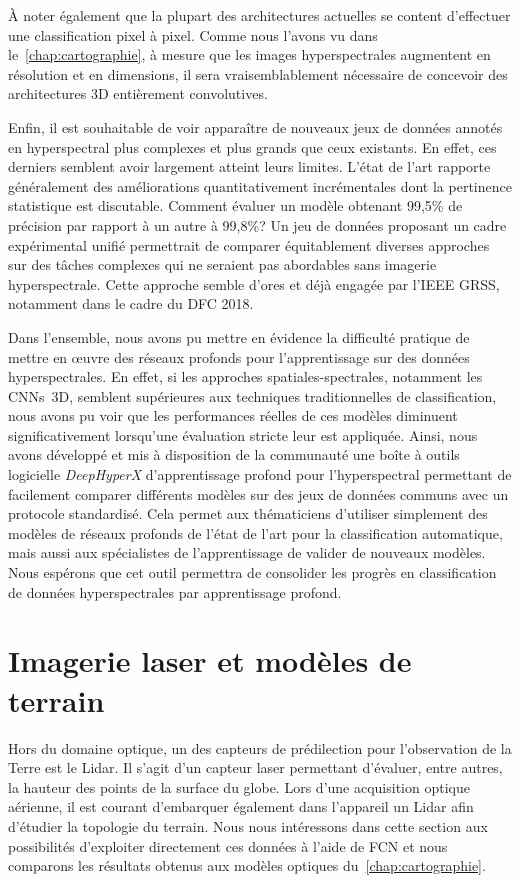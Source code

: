 À noter également que la plupart des architectures actuelles se content d'effectuer une classification pixel à pixel. Comme nous l'avons vu dans le~\cref{chap:cartographie}, à mesure que les images hyperspectrales augmentent en résolution et en dimensions, il sera vraisemblablement nécessaire de concevoir des architectures 3D entièrement convolutives.

Enfin, il est souhaitable de voir apparaître de nouveaux jeux de données annotés en hyperspectral plus complexes et plus grands que ceux existants. En effet, ces derniers semblent avoir largement atteint leurs limites. L'état de l'art rapporte généralement des améliorations quantitativement incrémentales dont la pertinence statistique est discutable. Comment évaluer un modèle obtenant 99,5\% de précision par rapport à un autre à 99,8\%? Un jeu de données proposant un cadre expérimental unifié permettrait de comparer équitablement diverses approches sur des tâches complexes qui ne seraient pas abordables sans imagerie hyperspectrale. Cette approche semble d'ores et déjà engagée par l'\gls{IEEE} \gls{GRSS}, notamment dans le cadre du \gls{DFC} 2018.

Dans l'ensemble, nous avons pu mettre en évidence la difficulté pratique de mettre en \oe{}uvre des réseaux profonds pour l'apprentissage sur des données hyperspectrales. En effet, si les approches spatiales-spectrales, notamment les \glspl{CNN}~3D, semblent supérieures aux techniques traditionnelles de classification, nous avons pu voir que les performances réelles de ces modèles diminuent significativement lorsqu'une évaluation stricte leur est appliquée. Ainsi, nous avons développé et mis à disposition de la communauté une boîte à outils logicielle \emph{DeepHyperX} d'apprentissage profond pour l'hyperspectral permettant de facilement comparer différents modèles sur des jeux de données communs avec un protocole standardisé. Cela permet aux thématiciens d'utiliser simplement des modèles de réseaux profonds de l'état de l'art pour la classification automatique, mais aussi aux spécialistes de l'apprentissage de valider de nouveaux modèles. Nous espérons que cet outil permettra de consolider les progrès en classification de données hyperspectrales par apprentissage profond.

\section{Imagerie laser et modèles de terrain}

Hors du domaine optique, un des capteurs de prédilection pour l'observation de la Terre est le \gls{Lidar}. Il s'agit d'un capteur laser permettant d'évaluer, entre autres, la hauteur des points de la surface du globe. Lors d'une acquisition optique aérienne, il est courant d'embarquer également dans l'appareil un \gls{Lidar} afin d'étudier la topologie du terrain. Nous nous intéressons dans cette section aux possibilités d'exploiter directement ces données à l'aide de \gls{FCN} et nous comparons les résultats obtenus aux modèles optiques du~\cref{chap:cartographie}.

